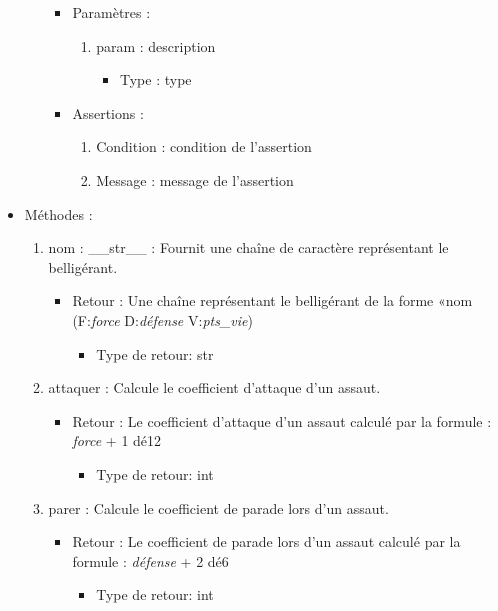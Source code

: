 \documentclass[12pt,pdftex,oneside]{article}
\begin{document}
\begin{itemize}
\begin{enumerate}
      \begin{itemize}
      \item Paramètres : 
        \begin{enumerate}
        \item param : description
          \begin{itemize}
          \item Type : type
          \end{itemize}
        \end{enumerate}
      \item Assertions : 
        \begin{enumerate}
          \item Condition : condition de l'assertion
          \item Message : message de l'assertion
        \end{enumerate}
      \end{itemize}
    \end{enumerate}

  \item Méthodes : 

    \begin{enumerate}
    \item nom : \_\_str\_\_ : Fournit une chaîne de caractère représentant le belligérant.
      \begin{itemize}
      \item Retour : Une chaîne représentant le belligérant de la forme «nom
        (F:\emph{force} D:\emph{défense} V:\emph{pts\_vie})
          \begin{itemize}
          \item Type de retour: str
          \end{itemize}
      \end{itemize}

    \item attaquer : Calcule le coefficient d'attaque d'un assaut.
      \begin{itemize}
      \item Retour : Le coefficient d'attaque d'un assaut calculé par la formule
        : \emph{force} + 1 dé12
          \begin{itemize}
          \item Type de retour: int
          \end{itemize}
      \end{itemize}

    \item parer : Calcule le coefficient de parade lors d'un assaut.
      \begin{itemize}
      \item Retour : Le coefficient de parade lors d'un assaut calculé par la
        formule : \emph{défense} + 2 dé6
          \begin{itemize}
          \item Type de retour: int
          \end{itemize}
      \end{itemize}


\end{enumerate}
\end{itemize}
\end{document}
